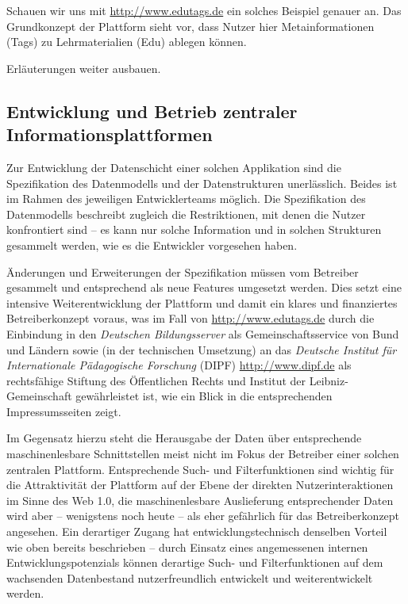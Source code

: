 \documentclass[a4paper,11pt]{article}
\begin{document}
Schauen wir uns mit \url{http://www.edutags.de} ein solches Beispiel genauer
an.  Das Grundkonzept der Plattform sieht vor, dass Nutzer hier
Metainformationen (Tags) zu Lehrmaterialien (Edu) ablegen können.
\begin{center}
  Erläuterungen weiter ausbauen.
\end{center}

\subsection{Entwicklung und Betrieb zentraler Informationsplattformen} 

Zur Entwicklung der Datenschicht einer solchen Applikation sind die
Spezifikation des Datenmodells und der Datenstrukturen unerlässlich.  Beides
ist im Rahmen des jeweiligen Entwicklerteams möglich. Die Spezifikation des
Datenmodells beschreibt zugleich die Restriktionen, mit denen die Nutzer
konfrontiert sind -- es kann nur solche Information und in solchen Strukturen
gesammelt werden, wie es die Entwickler vorgesehen haben.

Änderungen und Erweiterungen der Spezifikation müssen vom Betreiber gesammelt
und entsprechend als neue Features umgesetzt werden.  Dies setzt eine intensive
Weiterentwicklung der Plattform und damit ein klares und finanziertes
Betreiberkonzept voraus, was im Fall von \url{http://www.edutags.de} durch die
Einbindung in den \emph{Deutschen Bildungsserver} als Gemeinschaftsservice von
Bund und Ländern sowie (in der technischen Umsetzung) an das \emph{Deutsche
  Institut für Internationale Pädagogische Forschung} (DIPF)
\url{http://www.dipf.de} als rechtsfähige Stiftung des Öffentlichen Rechts und
Institut der Leibniz-Gemeinschaft gewährleistet ist, wie ein Blick in die
entsprechenden Impressumsseiten zeigt.  

Im Gegensatz hierzu steht die Herausgabe der Daten über entsprechende
maschinenlesbare Schnittstellen meist nicht im Fokus der Betreiber einer
solchen zentralen Plattform. Entsprechende Such- und Filterfunktionen sind
wichtig für die Attraktivität der Plattform auf der Ebene der direkten
Nutzerinteraktionen im Sinne des Web 1.0, die maschinenlesbare Auslieferung
entsprechender Daten wird aber -- wenigstens noch heute -- als eher gefährlich
für das Betreiberkonzept angesehen.  Ein derartiger Zugang hat
entwicklungstechnisch denselben Vorteil wie oben bereits beschrieben -- durch
Einsatz eines angemessenen internen Entwicklungspotenzials können derartige
Such- und Filterfunktionen auf dem wachsenden Datenbestand nutzerfreundlich
entwickelt und weiterentwickelt werden. 
\end{document}
